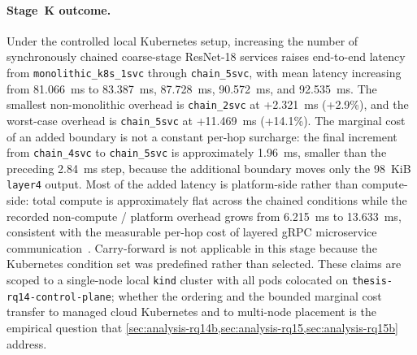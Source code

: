 \paragraph{Stage~K outcome.}
Under the controlled local Kubernetes setup, increasing the number of
synchronously chained coarse-stage ResNet-18 services raises
end-to-end latency from \texttt{monolithic\_k8s\_1svc} through
\texttt{chain\_5svc}, with mean latency increasing from 81.066~ms to
83.387~ms, 87.728~ms, 90.572~ms, and 92.535~ms. The smallest
non-monolithic overhead is \texttt{chain\_2svc} at +2.321~ms
(+2.9\%), and the worst-case overhead is \texttt{chain\_5svc} at
+11.469~ms (+14.1\%). The marginal cost of an added boundary is not a
constant per-hop surcharge: the final increment from
\texttt{chain\_4svc} to \texttt{chain\_5svc} is approximately
1.96~ms, smaller than the preceding 2.84~ms step, because the
additional boundary moves only the 98~KiB \texttt{layer4} output.
Most of the added latency is platform-side rather than compute-side:
total compute is approximately flat across the chained conditions
while the recorded non-compute / platform overhead grows from
6.215~ms to 13.633~ms, consistent with the measurable per-hop cost
of layered gRPC microservice
communication~\cite{rpc_overhead_hotos25,notnets_apsys24}.
Carry-forward is not applicable in this stage because the Kubernetes
condition set was predefined rather than selected. These claims are
scoped to a single-node local \texttt{kind} cluster with all pods
colocated on \texttt{thesis-rq14-control-plane}; whether the
ordering and the bounded marginal cost transfer to managed cloud
Kubernetes and to multi-node placement is the empirical question
that \cref{sec:analysis-rq14b,sec:analysis-rq15,sec:analysis-rq15b}
address.
